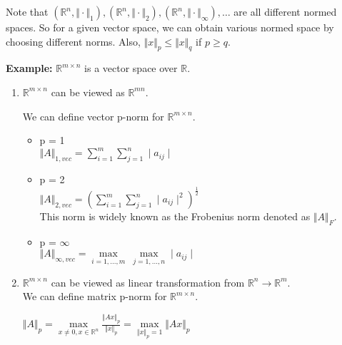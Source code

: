 \documentclass{article}
\begin{document}
\bigbreak
\begin{center}
\end{center} 

Note that $(\mathbb{R}^{n},\Vert \cdot \Vert _1), (\mathbb{R}^{n},\Vert \cdot \Vert _2), (\mathbb{R}^{n},\Vert \cdot \Vert _\infty), \dots$ are all different normed spaces. So for a given vector space, we can obtain various normed space by choosing different norms. Also, $\Vert x \Vert _p \leq \Vert x \Vert _q$ if $p \geq q$.

\bigbreak
\textbf{Example: } $\mathbb{R}^{m \times n}$ is a vector space over $\mathbb{R}$.
\begin{enumerate}
    \item  $\mathbb{R}^{m \times n}$ can be viewed as  $\mathbb{R}^{mn}$. \\
        \begin{center}
        \end{center}
        We can define vector p-norm for  $\mathbb{R}^{m \times n}$.
        \begin{itemize}
            \item p = 1 \\
            $\Vert A \Vert_{1,vec} = \sum_{i=1}^{m} \sum_{j=1}^{n} \mid{a_{ij}}\mid$ 
            \pagebreak
            \item p = 2 \\
            $\Vert A \Vert_{2,vec} = (\sum_{i=1}^{m} \sum_{j=1}^{n} \mid{a_{ij}} \mid ^ 2 ) ^ \frac{1}{2}$ \\
            \bigbreak
            This norm is widely known as the Frobenius norm denoted as 
            $\Vert A \Vert_{F}$. 
            \item p = $\infty$\\
            $\Vert A \Vert_{\infty,vec} = \underset{i=1,...,m}{\max} \ \underset{j=1,...,n}{\max} \mid{a_{ij}} \mid$
        \end{itemize}
    \item $\mathbb{R}^{m \times n}$ can be viewed as linear transformation from $\mathbb{R}^{n} \to \mathbb{R}^{m}$. \\
        We can define matrix p-norm for $\mathbb{R}^{m \times n}$. \\
        \begin{center}
            $\Vert A \Vert_p = \underset{x \neq 0, x \in \mathbb{R}^{n}}{\max} \frac{\Vert Ax \Vert_p}{\Vert x \Vert_p} = \underset{\Vert x \Vert_p = 1}{\max} \Vert Ax \Vert_p$  

\end{center}
\end{enumerate}
\end{document}
